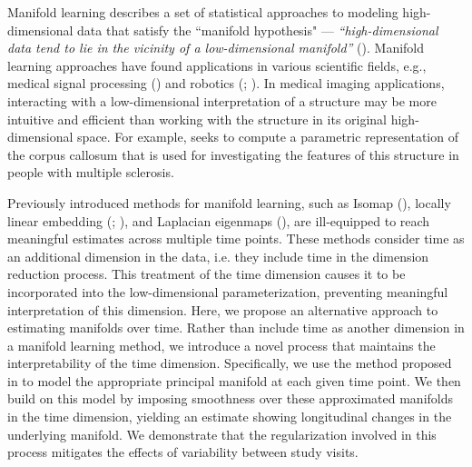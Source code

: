 \documentclass[11pt,reqno]{article}
\theoremstyle{definition}
\begin{document}
Manifold learning describes a set of statistical approaches to modeling high-dimensional data that satisfy the ``manifold hypothesis" --- \textit{``high-dimensional data tend to lie in the vicinity of a low-dimensional manifold''} (\cite{fefferman2016testing}). Manifold learning approaches have found applications in various scientific fields, e.g., medical signal processing (\cite{shen2022robust}) and robotics (\cite{gao2023k}; \cite{gao2024bi}). In medical imaging applications, interacting with a low-dimensional interpretation of a structure may be more intuitive and efficient than working with the structure in its original high-dimensional space. For example, \cite{yueParameterizationWhiteMatter2016} seeks to compute a parametric representation of the corpus callosum that is used for investigating the features of this structure in people with multiple sclerosis.

Previously introduced methods for manifold learning, such as Isomap (\cite{tenenbaumGlobalGeometricFramework2000}), locally linear embedding (\cite{roweisNonlinearDimensionalityReduction2000}; \cite{wu2018think}), and Laplacian eigenmaps (\cite{belkin2003laplacian}), are ill-equipped to reach meaningful estimates across multiple time points. These methods consider time as an additional dimension in the data, i.e. they include time in the dimension reduction process. This treatment of the time dimension causes it to be incorporated into the low-dimensional parameterization, preventing meaningful interpretation of this dimension. Here, we propose an alternative approach to estimating manifolds over time. Rather than include time as another dimension in a manifold learning method, we introduce a novel process that maintains the interpretability of the time dimension. Specifically, we use the method proposed in \cite{mengPrincipalManifoldEstimation2021} to model the appropriate principal manifold at each given time point. We then build on this model by imposing smoothness over these approximated manifolds in the time dimension, yielding an estimate showing longitudinal changes in the underlying manifold. We demonstrate that the regularization involved in this process mitigates the effects of variability between study visits.
\end{document}
